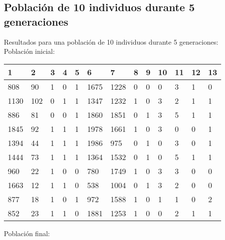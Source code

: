\subsection{Población de 10 individuos durante 5 generaciones}
Resultados para una población de 10 individuos durante 5 generaciones:
Población inicial:
\begin{table}[H]
\begin{tabular}{|l|l|l|l|l|l|l|l|l|l|l|l|l|}
\hline
\textbf{1} & \textbf{2} & \textbf{3} & \textbf{4} & \textbf{5} & \textbf{6} & \textbf{7} & \textbf{8} & \textbf{9} & \textbf{10} & \textbf{11} & \textbf{12} & \textbf{13} \\ \hline
808  &  90  &  1  &  0  &  1  &  1675  &  1228  &  0  &  0  &  0  &  3  &  1  &  0 \\ \hline
1130  &  102  &  0  &  1  &  1  &  1347  &  1232  &  1  &  0  &  3  &  2  &  1  &  1 \\ \hline
886  &  81  &  0  &  0  &  1  &  1860  &  1851  &  0  &  1  &  3  &  {\color[HTML]{FE0000}5}  &  1  &  1 \\ \hline
1845  &  92  &  1  &  1  &  1  &  1978  &  1661  &  1  &  0  &  3  &  0  &  0  &  1 \\ \hline
1394  &  44  &  1  &  1  &  1  &  1986  &  975  &  0  &  1  &  0  &  3  &  0  &  1 \\ \hline
1444  &  73  &  1  &  1  &  1  &  1364  &  1532  &  0  &  1  &  0  &  {\color[HTML]{FE0000}5}  &  1  &  1 \\ \hline
960  &  22  &  1  &  0  &  0  &  780  &  1749  &  1  &  0  &  3  &  3  &  0  &  0 \\ \hline
1663  &  12  &  1  &  1  &  0  &  538  &  1004  &  0  &  1  &  3  &  2  &  0  &  0 \\ \hline
877  &  18  &  1  &  0  &  1  &  972  &  1588  &  1  &  0  &  1  &  1  &  0  &  2 \\ \hline
852  &  23  &  1  &  1  &  0  &  1881  &  1253  &  1  &  0  &  0  &  2  &  1  &  1 \\ \hline
\end{tabular}
\end{table}
Población final:
